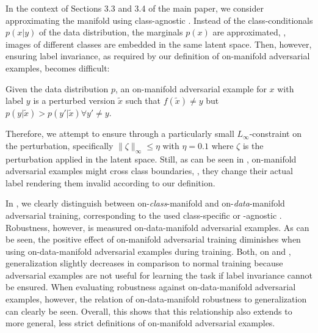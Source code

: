 \begin{appendix}
In the context of Sections 3.3 and 3.4 of the main paper, we consider approximating the manifold using class-agnostic \VAEGANs. Instead of the class-conditionals $p(x|y)$ of the data distribution, the marginals $p(x)$ are approximated, \ie, images of different classes are embedded in the same latent space. Then, however, ensuring label invariance, as required by our definition of on-manifold adversarial examples, becomes difficult:
\begin{definition}
    Given the data distribution $p$, an on-manifold adversarial example for $x$ with label $y$ is a perturbed version $\tilde{x}$ such that $f(\tilde{x}) \neq y$ but $p(y|\tilde{x}) > p(y'|\tilde{x}) \forall y' \neq y$.
    \label{def:appendix-on-manifold-adversarial-example}
\end{definition}
\noindent Therefore, we attempt to ensure  through a particularly small $L_{\infty}$-constraint on the perturbation, specifically $\|\zeta\|_{\infty} \leq \eta$ with $\eta = 0.1$ where $\zeta$ is the perturbation applied in the latent space. Still, as can be seen in , on-manifold adversarial examples might cross class boundaries, \ie, they change their actual label rendering them invalid according to our definition.

In , we clearly distinguish between on-\emph{class}-manifold and on-\emph{data}-manifold adversarial training, corresponding to the used class-specific or -agnostic \VAEGANs. Robustness, however, is measured \wrt on-data-manifold adversarial examples.  As can be seen, the positive effect of on-manifold adversarial training diminishes when using on-data-manifold adversarial examples during training. Both, on \Fonts and \MNIST, generalization slightly decreases in comparison to normal training because adversarial examples are not useful for learning the task if label invariance cannot be ensured. When evaluating robustness against on-data-manifold adversarial examples, however, the relation of on-data-manifold robustness to generalization can clearly be seen. Overall, this shows that this relationship also extends to more general, less strict definitions of on-manifold adversarial examples.


\end{appendix}
